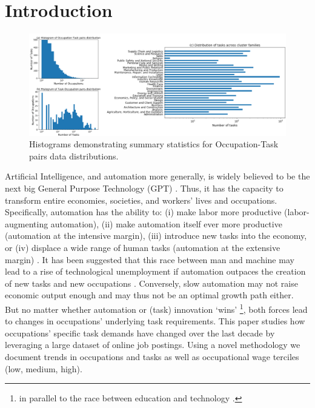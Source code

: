 \documentclass[letterpaper]{article} %
\begin{document}
\section{Introduction}
\label{sec:intro}
\begin{figure}[h!]
    \centering
    \includegraphics[width=0.85\linewidth]{combined_stats.png}
    \caption{Histograms demonstrating summary statistics for Occupation-Task pairs data distributions.}
    \label{fig:Skill2SOC}
\end{figure}
Artificial Intelligence, and automation more generally, is widely believed to be the next big General Purpose Technology (GPT) \cite{Brynjolfsson2018b}. Thus, it has the capacity to transform entire economies, societies, and workers' lives and occupations. Specifically, automation has the ability to: (i) make labor more productive (labor-augmenting automation), (ii) make automation itself ever more productive (automation at the intensive margin), (iii) introduce new tasks into the economy, or (iv) displace a wide range of human tasks (automation at the extensive margin) \cite{Acemoglu2019}. It has been suggested that this race between man and machine may lead to a rise of technological unemployment if automation outpaces the creation of new tasks and new occupations \cite{Acemoglu2018c}. Conversely, slow automation may not raise economic output enough and may thus not be an optimal growth path either. But no matter whether automation or (task) innovation `wins' \footnote{in parallel to the race between education and technology \cite{Goldin2007}.}, both forces lead to changes in occupations' underlying task requirements. This paper studies how occupations' specific task demands have changed over the last decade by leveraging a large dataset of online job postings. Using a novel methodology we document trends in occupations and tasks as well as occupational wage terciles (low, medium, high).
\par
\end{document}
